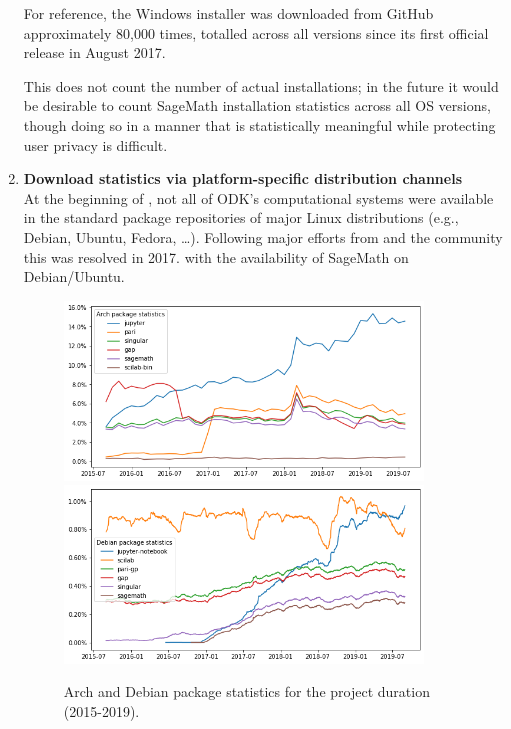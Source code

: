 \begin{enumerate}
  For reference, the Windows installer was downloaded from GitHub
  approximately 80,000 times, totalled across all versions since its
  first official release in August 2017.

  This does not count the number of actual installations; in the future it
  would be desirable to count SageMath installation statistics across all
  OS versions, though doing so in a manner that is statistically meaningful
  while protecting user privacy is difficult.

\item \textbf{Download statistics via platform-specific distribution
    channels}\\
  At the beginning of \ODK, not all of ODK's computational systems
  were available in the standard package repositories of major Linux
  distributions (e.g., Debian, Ubuntu, Fedora, \dots). Following major
  efforts from \ODK and the community this was resolved in 2017. with
  the availability of SageMath on Debian/Ubuntu.
  
  \begin{figure}
    \centering
    \includegraphics[width=0.9\textwidth]{arch-pkgstats.png}
    \includegraphics[width=0.9\textwidth]{debian-pkgstats.png}
    \caption{Arch and Debian package statistics for the project
      duration (2015-2019).}
    \label{fig:pkgstats}
  \end{figure}


\end{enumerate}

